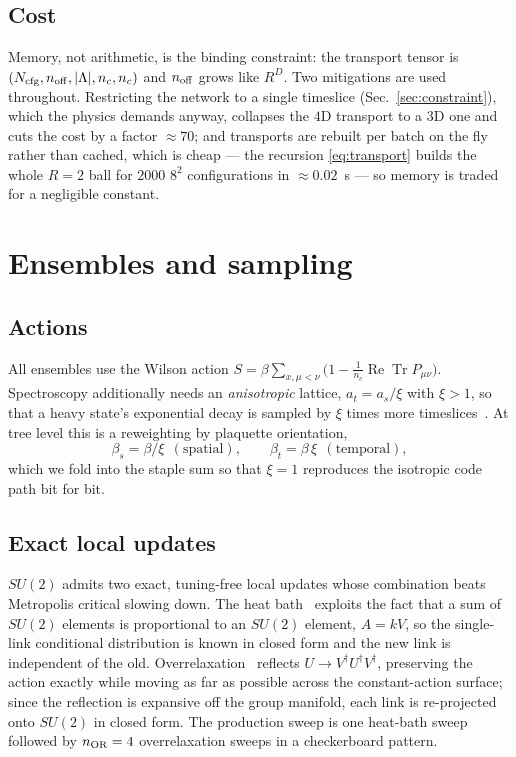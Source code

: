 \documentclass[aps,prl,reprint,superscriptaddress,nofootinbib]{revtex4-2}
\newcommand{\Tr}{\operatorname{Tr}}
\newcommand{\at}{a_t}
\newcommand{\as}{a_s}
\begin{document}
\subsection{Cost}

Memory, not arithmetic, is the binding constraint: the transport tensor is
$(N_{\rm cfg}, n_{\rm off}, |\Lambda|, n_c, n_c)$ and $n_{\rm off}$ grows like
$R^D$. Two mitigations are used throughout. Restricting the network to a single
timeslice (Sec.~\ref{sec:constraint}), which the physics demands anyway,
collapses the $4$D transport to a $3$D one and cuts the cost by a factor
$\approx70$; and transports are rebuilt per batch on the fly rather than cached,
which is cheap --- the recursion \eqref{eq:transport} builds the whole $R=2$ ball
for $2000$ $8^2$ configurations in $\approx0.02$~s --- so memory is traded for a
negligible constant.

\section{Ensembles and sampling}
\label{sec:sampling}

\subsection{Actions}

All ensembles use the Wilson action
$S=\beta\sum_{x,\mu<\nu}\!\big(1-\tfrac{1}{n_c}\operatorname{Re}\Tr P_{\mu\nu}\big)$.
Spectroscopy additionally needs an \emph{anisotropic} lattice, $\at=\as/\xi$
with $\xi>1$, so that a heavy state's exponential decay is sampled by $\xi$
times more timeslices~\cite{MorningstarPeardon1999}. At tree level this is a
reweighting by plaquette orientation,
\begin{equation}
  \beta_s=\beta/\xi \ \ (\text{spatial}),\qquad
  \beta_t=\beta\,\xi \ \ (\text{temporal}),
  \label{eq:aniso}
\end{equation}
which we fold into the staple sum so that $\xi=1$ reproduces the isotropic code
path bit for bit.

\subsection{Exact local updates}

$SU(2)$ admits two exact, tuning-free local updates whose combination beats
Metropolis critical slowing down. The heat
bath~\cite{Creutz1980,KennedyPendleton1985} exploits the fact that a sum of
$SU(2)$ elements is proportional to an $SU(2)$ element, $A=kV$, so the
single-link conditional distribution is known in closed form and the new link is
independent of the old. Overrelaxation~\cite{Creutz1987} reflects
$U\to V^\dagger U^\dagger V^\dagger$, preserving the action exactly while moving
as far as possible across the constant-action surface; since the reflection is
expansive off the group manifold, each link is re-projected onto $SU(2)$ in
closed form. The production sweep is one heat-bath sweep followed by
$n_{\rm OR}=4$ overrelaxation sweeps in a checkerboard pattern.
\end{document}
